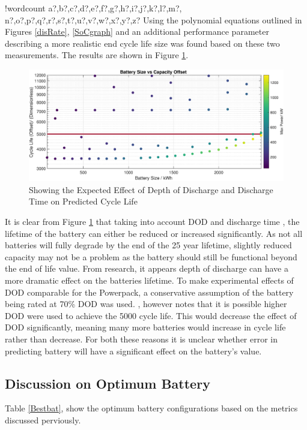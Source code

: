 \documentclass[fontsize=9.5pt]{extarticle}
\numberwithin{figure}{section} %
\newcounter{words}
\newenvironment{counted}{%
  \setcounter{words}{0}
  \SearchList!{wordcount}{\stepcounter{words}}
    {a?,b?,c?,d?,e?,f?,g?,h?,i?,j?,k?,l?,m?,
    n?,o?,p?,q?,r?,s?,t?,u?,v?,w?,x?,y?,z?}
  \UndoBoundary{'}
  \SearchOrder{p;}}{%
  \StopSearching}
\begin{document}
\begin{counted}
Using the polynomial equations outlined in Figures \ref{disRate},
\ref{SoCgraph} and an additional performance parameter describing a more
realistic end cycle life size was found based on these two measurements.
The results are shown in Figure \ref{capnew}.

\begin{figure}[H]
 \centering
 \includegraphics[trim = 0 0 0 0, clip, width=1\textwidth]{capnew2.eps}
 \caption{Showing the Expected Effect of Depth of Discharge and Discharge Time on Predicted Cycle Life}
 \label{capnew}
 \vspace{-20pt}
 \end{figure}

It is clear from Figure \ref{capnew} that taking into account DOD and
discharge time , the lifetime of the battery can either be reduced or
increased significantly. As not all batteries will fully degrade by the
end of the 25 year lifetime, slightly reduced capacity may not be a
problem as the battery should still be functional beyond the end of life
value. From research, it appears depth of discharge can have a more
dramatic effect on the batteries lifetime. To make experimental effects
of DOD comparable for the Powerpack, a conservative assumption of the
battery being rated at 70\% DOD was used. \cite{Teslawil27:online},
however notes that it is possible higher DOD were used to achieve the
5000 cycle life. This would decrease the effect of DOD significantly,
meaning many more batteries would increase in cycle life rather than
decrease. For both these reasons it is unclear whether error in
predicting battery will have a significant effect on the battery's
value.

\subsection{Discussion on Optimum
Battery}\label{discussion-on-optimum-battery}

Table \ref{Bestbat}, show the optimum battery configurations based on
the metrics discussed perviously.


\end{counted}
\end{document}
